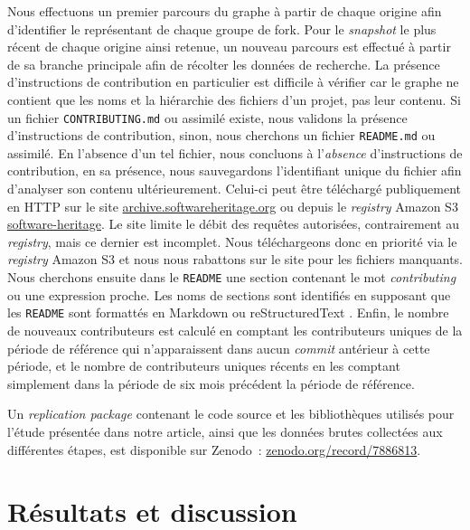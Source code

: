 \documentclass[dvipsnames,runningheads]{llncs}
\newcommand{\en}[1]{\foreignlanguage{english}{\emph{#1}}}
\begin{document}
    Nous effectuons un premier parcours du graphe à partir de chaque origine afin d'identifier le représentant
    de chaque groupe de fork. Pour le \en{snapshot} le plus récent de chaque origine ainsi retenue, un nouveau
    parcours est effectué à partir de sa branche principale afin de récolter les données de recherche. La
    présence d'instructions de contribution en particulier est difficile à vérifier car le graphe ne contient
    que les noms et la hiérarchie des fichiers d'un projet, pas leur contenu. Si un fichier
    \texttt{CONTRIBUTING.md} ou assimilé existe, nous validons la présence d'instructions de contribution,
    sinon, nous cherchons un fichier \texttt{README.md} ou assimilé. En l'absence d'un tel fichier, nous
    concluons à l'\emph{absence} d'instructions de contribution, en sa présence, nous sauvegardons
    l'identifiant unique du fichier afin d'analyser son contenu ultérieurement. Celui-ci peut être téléchargé
    publiquement en HTTP sur le site
    \href{https://archive.softwareheritage.org/}{archive.softwareheritage.org} ou depuis le \en{registry}
    Amazon S3 \href{https://registry.opendata.aws/software-heritage}{software-heritage}. Le site limite le
    débit des requêtes autorisées, contrairement au \en{registry}, mais ce dernier est incomplet. Nous
    téléchargeons donc en priorité via le \en{registry} Amazon S3 et nous nous rabattons sur le site pour les
    fichiers manquants. Nous cherchons ensuite dans le \texttt{README} une section contenant le mot
    \en{contributing} ou une expression proche. Les noms de sections sont identifiés en supposant que les
    \texttt{README} sont formattés en Markdown ou reStructuredText \parencite{markdown-headings,rst-sections}.
    Enfin, le nombre de nouveaux contributeurs est calculé en comptant les contributeurs uniques de la période
    de référence qui n'apparaissent dans aucun \en{commit} antérieur à cette période, et le nombre de
    contributeurs uniques récents en les comptant simplement dans la période de six mois précédent la période
    de référence.

    Un \en{replication package} contenant le code source et les bibliothèques utilisés pour l'étude présentée
    dans notre article, ainsi que les données brutes collectées aux différentes étapes, est disponible sur
    Zenodo : \href{https://zenodo.org/record/7886813}{zenodo.org/record/7886813}.

    \section{Résultats et discussion}
\end{document}
